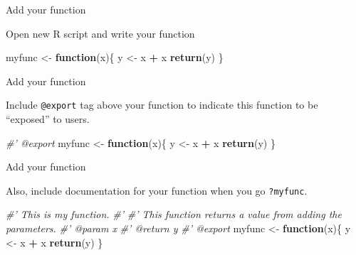 \documentclass[
  ignorenonframetext,
]{beamer}
\newenvironment{Shaded}{\begin{snugshade}}{\end{snugshade}}
\newcommand{\CommentTok}[1]{\textcolor[rgb]{0.56,0.35,0.01}{\textit{#1}}}
\newcommand{\ControlFlowTok}[1]{\textcolor[rgb]{0.13,0.29,0.53}{\textbf{#1}}}
\newcommand{\KeywordTok}[1]{\textcolor[rgb]{0.13,0.29,0.53}{\textbf{#1}}}
\newcommand{\NormalTok}[1]{#1}
\newcommand{\OperatorTok}[1]{\textcolor[rgb]{0.81,0.36,0.00}{\textbf{#1}}}
\newcommand{\StringTok}[1]{\textcolor[rgb]{0.31,0.60,0.02}{#1}}
\begin{document}
\begin{frame}[fragile]{Add your function}
\protect\hypertarget{add-your-function}{}

Open new R script and write your function

\begin{Shaded}
\begin{Highlighting}[]
\NormalTok{myfunc <-}\StringTok{ }\ControlFlowTok{function}\NormalTok{(x)\{}
\NormalTok{  y <-}\StringTok{ }\NormalTok{x }\OperatorTok{+}\StringTok{ }\NormalTok{x}
  \KeywordTok{return}\NormalTok{(y)}
\NormalTok{\}}
\end{Highlighting}
\end{Shaded}

\end{frame}

\begin{frame}[fragile]{Add your function}
\protect\hypertarget{add-your-function-1}{}

Include \texttt{@export} tag above your function to indicate this
function to be ``exposed'' to users.

\begin{Shaded}
\begin{Highlighting}[]
\CommentTok{#' @export}
\NormalTok{myfunc <-}\StringTok{ }\ControlFlowTok{function}\NormalTok{(x)\{}
\NormalTok{  y <-}\StringTok{ }\NormalTok{x }\OperatorTok{+}\StringTok{ }\NormalTok{x}
  \KeywordTok{return}\NormalTok{(y)}
\NormalTok{\}}
\end{Highlighting}
\end{Shaded}

\end{frame}

\begin{frame}[fragile]{Add your function}
\protect\hypertarget{add-your-function-2}{}

Also, include documentation for your function when you go
\texttt{?myfunc}. \small

\begin{Shaded}
\begin{Highlighting}[]
\CommentTok{#' This is my function.}
\CommentTok{#'}
\CommentTok{#' This function returns a value from adding the parameters.}
\CommentTok{#' @param x}
\CommentTok{#' @return y}
\CommentTok{#' @export}
\NormalTok{myfunc <-}\StringTok{ }\ControlFlowTok{function}\NormalTok{(x)\{}
\NormalTok{  y <-}\StringTok{ }\NormalTok{x }\OperatorTok{+}\StringTok{ }\NormalTok{x}
  \KeywordTok{return}\NormalTok{(y)}
\NormalTok{\}}
\end{Highlighting}
\end{Shaded}

\end{frame}
\end{document}
